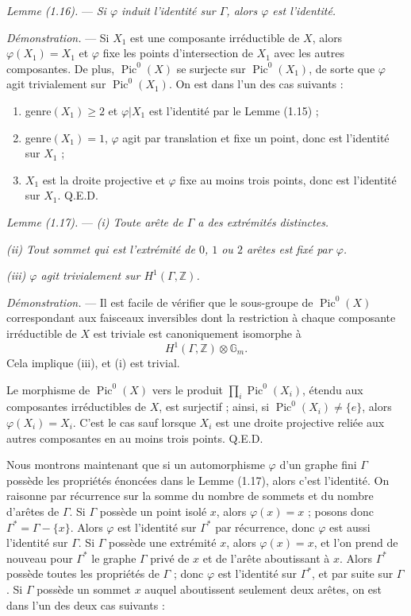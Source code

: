 \documentclass[10pt]{article}
\newcommand{\Pic}{\operatorname{Pic}}
\newcommand{\QED}{\hfill Q.E.D.}
\begin{document}
\medskip
\noindent\emph{Lemme (1.16).} --- \emph{Si $\varphi$ induit l'identité sur $\Gamma$, alors $\varphi$ est l'identité.}

\noindent\emph{Démonstration.} --- Si $X_1$ est une composante irréductible de $X$, alors $\varphi(X_1)=X_1$ et $\varphi$ fixe les points d'intersection de $X_1$ avec les autres composantes. De plus, $\Pic^0(X)$ se surjecte sur $\Pic^0(X_1)$, de sorte que $\varphi$ agit trivialement sur $\Pic^0(X_1)$. On est dans l'un des cas suivants :
\begin{enumerate}[label=\emph{\alph*)}]
\item genre$(X_1)\geq2$ et $\varphi|X_1$ est l'identité par le Lemme (1.15) ;
\item genre$(X_1)=1$, $\varphi$ agit par translation et fixe un point, donc est l'identité sur $X_1$ ;
\item $X_1$ est la droite projective et $\varphi$ fixe au moins trois points, donc est l'identité sur $X_1$. \QED
\end{enumerate}

\medskip
\noindent\emph{Lemme (1.17).} --- \emph{(i) Toute arête de $\Gamma$ a des extrémités distinctes.}

\emph{(ii) Tout sommet qui est l'extrémité de $0$, $1$ ou $2$ arêtes est fixé par $\varphi$.}

\emph{(iii) $\varphi$ agit trivialement sur $H^1(\Gamma,\mathbb Z)$.}

\noindent\emph{Démonstration.} --- Il est facile de vérifier que le sous-groupe de $\Pic^0(X)$ correspondant aux faisceaux inversibles dont la restriction à chaque composante irréductible de $X$ est triviale est canoniquement isomorphe à
\[
H^1(\Gamma,\mathbb Z)\otimes\mathbb G_m.
\]
Cela implique (iii), et (i) est trivial.

Le morphisme de $\Pic^0(X)$ vers le produit $\prod_i\Pic^0(X_i)$, étendu aux composantes irréductibles de $X$, est surjectif ; ainsi, si $\Pic^0(X_i)\neq\{e\}$, alors $\varphi(X_i)=X_i$. C'est le cas sauf lorsque $X_i$ est une droite projective reliée aux autres composantes en au moins trois points. \QED

Nous montrons maintenant que si un automorphisme $\varphi$ d'un graphe fini $\Gamma$ possède les propriétés énoncées dans le Lemme (1.17), alors c'est l'identité. On raisonne par récurrence sur la somme du nombre de sommets et du nombre d'arêtes de $\Gamma$. Si $\Gamma$ possède un point isolé $x$, alors $\varphi(x)=x$ ; posons donc $\Gamma^*=\Gamma-\{x\}$. Alors $\varphi$ est l'identité sur $\Gamma^*$ par récurrence, donc $\varphi$ est aussi l'identité sur $\Gamma$. Si $\Gamma$ possède une extrémité $x$, alors $\varphi(x)=x$, et l'on prend de nouveau pour $\Gamma^*$ le graphe $\Gamma$ privé de $x$ et de l'arête aboutissant à $x$. Alors $\Gamma^*$ possède toutes les propriétés de $\Gamma$ ; donc $\varphi$ est l'identité sur $\Gamma^*$, et par suite sur $\Gamma$. Si $\Gamma$ possède un sommet $x$ auquel aboutissent seulement deux arêtes, on est dans l'un des deux cas suivants :
\end{document}
